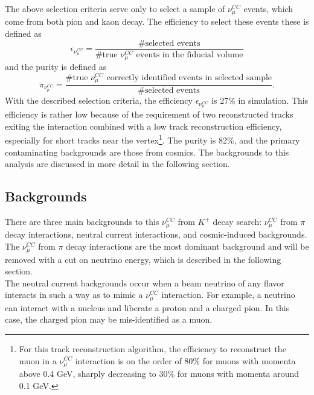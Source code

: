 The above selection criteria serve only to select a sample of $\nu_\mu^{CC}$ events, which come from both pion and kaon decay. The efficiency to select these events these is defined as
\begin{equation}
\epsilon_{\nu_\mu^{CC}} = \frac{\text{\# selected events}}{\text{\# true $\nu_\mu^{CC}$ events in the fiducial volume}}
\end{equation}
and the purity is defined as
\begin{equation}
\pi_{\nu_\mu^{CC}} = \frac{\text{\# true $\nu_\mu^{CC}$ correctly identified events in selected sample}}{\text{\# selected events}}.
\end{equation}
With the described selection criteria, the efficiency $\epsilon_{\nu_\mu^{CC}}$ is 27\% in simulation. This efficiency is rather low because of the requirement of two reconstructed tracks exiting the interaction combined with a low track reconstruction efficiency, especially for short tracks near the vertex\footnote{For this track reconstruction algorithm, the efficiency to reconstruct the muon in a $\nu_\mu^{CC}$ interaction is on the order of 80\% for muons with momenta above 0.4 GeV, sharply decreasing to 30\% for muons with momenta around 0.1 GeV.}. The purity is 82\%, and the primary contaminating backgrounds are those from cosmics. The backgrounds to this analysis are discussed in more detail in the following section.

\subsection{Backgrounds}
There are three main backgrounds to this $\nu_\mu^{CC}$ from $K^+$ decay search: $\nu_\mu^{CC}$ from $\pi$ decay interactions, neutral current interactions, and cosmic-induced backgrounds. The $\nu_\mu^{CC}$ from $\pi$ decay interactions are the most dominant background and will be removed with a cut on neutrino energy, which is described in the following section.\\

The neutral current backgrounds occur when a beam neutrino of any flavor interacts in such a way as to mimic a $\nu_\mu^{CC}$ interaction. For example, a neutrino can interact with a nucleus and liberate a proton and a charged pion. In this case, the charged pion may be mis-identified as a muon.\\ %

